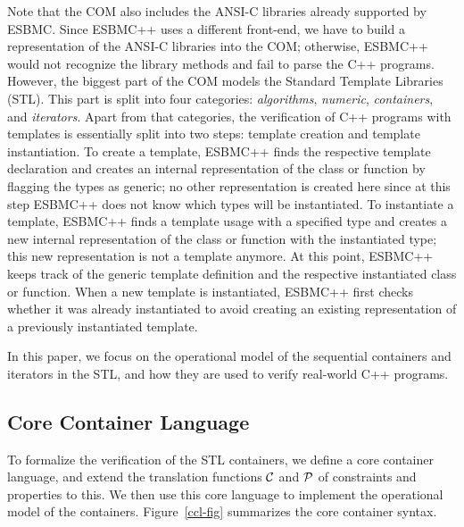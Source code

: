 \documentclass[conference]{IEEEtran}
\begin{document}
Note that the COM also includes the ANSI-C libraries already
supported by ESBMC.  Since ESBMC++ uses a different front-end, we have to build
a representation of the ANSI-C libraries into the COM; otherwise, ESBMC++ would
not recognize the library methods and fail to parse the C++ programs.
%
However, the biggest part of the COM models 
the Standard Template Libraries (STL).
This part is split into
four categories: \textit{algorithms}, \textit{numeric},
\textit{containers}, and \textit{iterators}.
Apart from that categories, the verification of C++ programs with 
templates is essentially split into two steps: template creation 
and template instantiation. To create a template, ESBMC++ finds 
the respective template declaration and creates an internal representation 
of the class or function by flagging the types as generic; no other representation 
is created here since at this step ESBMC++ does not know which types will be 
instantiated. To instantiate a template, ESBMC++ finds a template usage 
with a specified type and creates a new internal representation of the 
class or function with the instantiated type; this new representation 
is not a template anymore. At this point, ESBMC++ keeps track of the 
generic template definition and the respective instantiated class or function.
When a new template is instantiated, ESBMC++ first checks whether it was already 
instantiated to avoid creating an existing representation of a previously 
instantiated template. 

In this paper, we focus on the operational model of the
sequential containers and iterators in the STL,
and how they are used to
verify real-world C++ programs.



\subsection{Core Container Language}

To formalize the verification of the STL containers,
we define a core container language, and extend the translation
functions $\cal C$ and  $\cal P$ of constraints and properties to this.
We then use this core language to implement the operational model 
of the containers. Figure~\ref{ccl-fig} summarizes the core container 
syntax.
\end{document}
